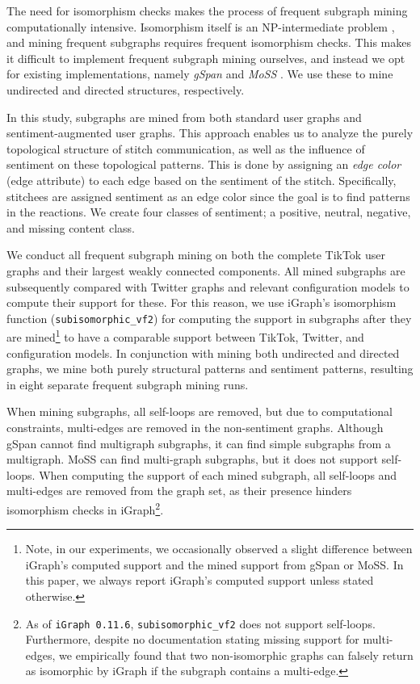 The need for isomorphism checks makes the process of frequent subgraph mining computationally intensive. Isomorphism itself is an NP-intermediate problem \citep{aaronson2016p}, and mining frequent subgraphs requires frequent isomorphism checks. This makes it difficult to implement frequent subgraph mining ourselves, and instead we opt for existing implementations, namely \textit{gSpan} \citep{yan2002gspan} and \textit{MoSS} \citep{borgelt2002moss}. We use these to mine undirected and directed structures, respectively. 

In this study, subgraphs are mined from both standard user graphs and sentiment-augmented user graphs. This approach enables us to analyze the purely topological structure of stitch communication, as well as the influence of sentiment on these topological patterns. This is done by assigning an \textit{edge color} (edge attribute) to each edge based on the sentiment of the stitch. Specifically, stitchees are assigned sentiment as an edge color since the goal is to find patterns in the reactions. We create four classes of sentiment; a positive, neutral, negative, and missing content class. 


We conduct all frequent subgraph mining on both the complete TikTok user graphs and their largest weakly connected components. All mined subgraphs are subsequently compared with Twitter graphs and relevant configuration models to compute their support for these. For this reason, we use iGraph's isomorphism function (\texttt{subisomorphic\_vf2}) for computing the support in subgraphs after they are mined\footnote{Note, in our experiments, we occasionally observed a slight difference between iGraph's computed support and the mined support from gSpan or MoSS. In this paper, we always report iGraph's computed support unless stated otherwise.} to have a comparable support between TikTok, Twitter, and configuration models. In conjunction with mining both undirected and directed graphs, we mine both purely structural patterns and sentiment patterns, resulting in eight separate frequent subgraph mining runs. 

When mining subgraphs, all self-loops are removed, but due to computational constraints, multi-edges are removed in the non-sentiment graphs. Although gSpan cannot find multigraph subgraphs, it can find simple subgraphs from a multigraph. MoSS can find multi-graph subgraphs, but it does not support self-loops. When computing the support of each mined subgraph, all self-loops and multi-edges are removed from the graph set, as their presence hinders isomorphism checks in iGraph\footnote{As of \texttt{iGraph 0.11.6}, \texttt{subisomorphic\_vf2} does not support self-loops. Furthermore, despite no documentation stating missing support for multi-edges, we empirically found that two non-isomorphic graphs can falsely return as isomorphic by iGraph if the subgraph contains a multi-edge.}. 

